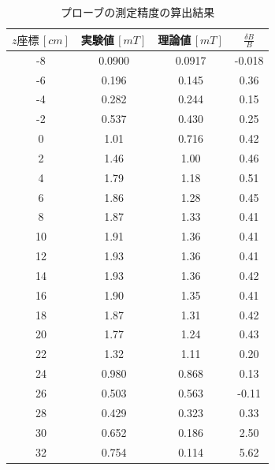 \begin{enumerate}
\begin{description}
        \begin{table}[H]
            \centering
            \caption{プローブの測定精度の算出結果}
            \begin{tabular}{c|cc|c}
            \hline
                $z座標\,[\si{cm}]$ & 実験値\,$[\si{mT}]$ & 理論値\,$[\si{mT}]$ & $\frac{\delta B}{B}$ \\ \hline
                -8 & 0.0900 & 0.0917 & -0.018 \\ 
                -6 & 0.196 & 0.145 & 0.36 \\ 
                -4 & 0.282 & 0.244 & 0.15 \\ 
                -2 & 0.537 & 0.430 & 0.25 \\ 
                0 & 1.01 & 0.716 & 0.42 \\ 
                2 & 1.46 & 1.00 & 0.46 \\ 
                4 & 1.79 & 1.18 & 0.51 \\ 
                6 & 1.86 & 1.28 & 0.45 \\ 
                8 & 1.87 & 1.33 & 0.41 \\ 
                10 & 1.91 & 1.36 & 0.41 \\ 
                12 & 1.93 & 1.36 & 0.41 \\ 
                14 & 1.93 & 1.36 & 0.42 \\ 
                16 & 1.90 & 1.35 & 0.41 \\ 
                18 & 1.87 & 1.31 & 0.42 \\ 
                20 & 1.77 & 1.24 & 0.43 \\ 
                22 & 1.32 & 1.11 & 0.20 \\ 
                24 & 0.980 & 0.868 & 0.13 \\ 
                26 & 0.503 & 0.563 & -0.11 \\ 
                28 & 0.429 & 0.323 & 0.33 \\ 
                30 & 0.652 & 0.186 & 2.50 \\ 
                32 & 0.754 & 0.114 & 5.62 \\ \hline
            \end{tabular}
        \end{table}
    \end{description}

    \newpage


\end{enumerate}
